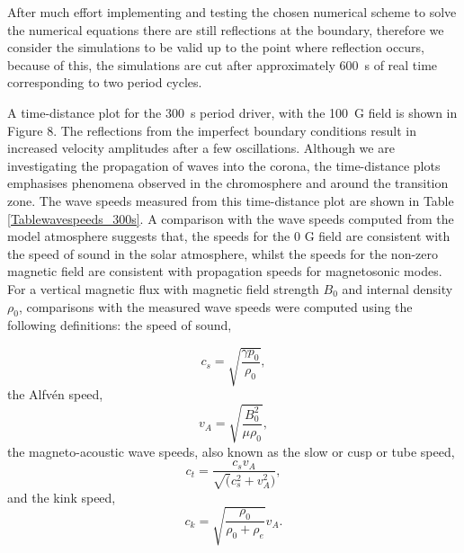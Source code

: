 \documentclass[physics,article,submit,pdftex,moreauthors]{Definitions/mdpi}
\begin{document}
After much  effort implementing and testing  the chosen numerical scheme to solve the numerical equations there are still reflections at the boundary, therefore we consider the simulations to be valid up to the point where reflection occurs, because of this, the simulations are cut after approximately 600~s of real time corresponding to two period cycles.

A  time-distance plot for the 300~s period driver, with the 100~G field is shown in Figure 8. The reflections from the imperfect boundary conditions result in increased velocity amplitudes after a few oscillations. Although we are investigating the propagation of waves into the corona, the time-distance plots emphasises phenomena observed in the chromosphere and around the transition zone.  The wave speeds measured from this time-distance plot are shown in Table \ref{Tablewavespeeds_300s}. A comparison with the wave speeds computed from the model atmosphere suggests that, the speeds for the 0 G field are consistent with the speed of sound in the solar atmosphere, whilst the speeds for the non-zero magnetic field are consistent with propagation speeds for magnetosonic modes.
For a  vertical magnetic flux %
with magnetic field strength $B_{0}$ and internal density $\rho_{0}$, comparisons with the measured wave speeds were computed using the following definitions:
the speed of sound,

\begin{equation}
 c_{s}  =    \sqrt{\frac{\gamma p_0}{\rho_0}}, 
\label{e10}
\end{equation}
the Alfvén speed,
\begin{equation}
 v_{A}  =    \sqrt{\frac{B_{0}^{2}}{\mu\rho_{0}}},  
\label{e11}
\end{equation}
the magneto-acoustic wave speeds, also known as  the slow or cusp or tube speed,
\begin{equation}
 c_{t}  =    \frac{c_s v_A}{\sqrt(c_s^2+v_A^2)}, 
\label{e12}
\end{equation}
and the kink speed,
\begin{equation}
 c_{k}  =    \sqrt{\frac{\rho_0}{\rho_0+\rho_e}}v_A.
\label{e12}
\end{equation}
\end{document}
